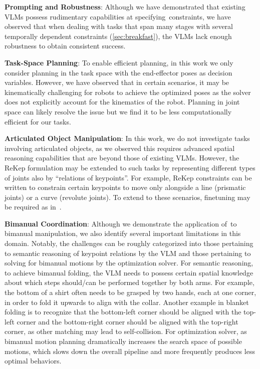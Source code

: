 \textbf{Prompting and Robustness}: Although we have demonstrated that existing VLMs possess rudimentary capabilities at specifying~\algabrvname constraints, we have observed that when dealing with tasks that span many stages with several temporally dependent constraints (\ref{sec:breakfast}), the VLMs lack enough robustness to obtain consistent success.

\textbf{Task-Space Planning}: To enable efficient planning, in this work we only consider planning in the task space with the end-effector poses as decision variables. However, we have observed that in certain scenarios, it may be kinematically challenging for robots to achieve the optimized poses as the solver does not explicitly account for the kinematics of the robot. Planning in joint space can likely resolve the issue but we find it to be less computationally efficient for our tasks.

\textbf{Articulated Object Manipulation}: In this work, we do not investigate tasks involving articulated objects, as we observed this requires advanced spatial reasoning capabilities that are beyond those of existing VLMs. However, the ReKep formulation may be extended to such tasks by representing different types of joints also by ``relations of keypoints''. For example, ReKep constraints can be written to constrain certain keypoints to move only alongside a line (prismatic joints) or a curve (revolute joints). To extend to these scenarios, finetuning may be required as in~\cite{li2024manipllm,xia2023kinematic,huang2024a3vlm}.

\textbf{Bimanual Coordination}: Although we demonstrate the application of~\algabrvname to bimanual manipulation, we also identify several important limitations in this domain. Notably, the challenges can be roughly categorized into those pertaining to semantic reasoning of keypoint relations by the VLM and those pertaining to solving for bimanual motions by the optimization solver.
For semantic reasoning, to achieve bimanual folding, the VLM needs to possess certain spatial knowledge about which steps should/can be performed together by both arms. For example, the bottom of a shirt often needs to be grasped by two hands, each at one corner, in order to fold it upwards to align with the collar. Another example in blanket folding is to recognize that the bottom-left corner should be aligned with the top-left corner and the bottom-right corner should be aligned with the top-right corner, as other matching may lead to self-collision.
For optimization solver, as bimanual motion planning dramatically increases the search space of possible motions, which slows down the overall pipeline and more frequently produces less optimal behaviors.

